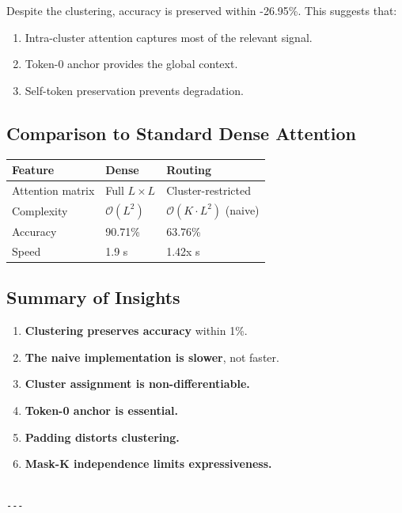 Despite the clustering, accuracy is preserved within -26.95\%. This 
suggests that:

\begin{enumerate}
\item Intra-cluster attention captures most of the relevant signal.
\item Token-0 anchor provides the global context.
\item Self-token preservation prevents degradation.

\end{enumerate}
\subsection{Comparison to Standard Dense Attention}

\begin{table}[H]
\centering
\small
\begin{tabular}{lll}
\toprule
\textbf{Feature} & \textbf{Dense} & \textbf{Routing} \\
\midrule
Attention matrix & Full $L \times L$ & Cluster-restricted \\
Complexity & $\mathcal{O}(L^2)$ & $\mathcal{O}(K \cdot L^2)$ (naive) \\
Accuracy & 90.71\% & 63.76\% \\
Speed & 1.9 s & 1.42x s \\
\bottomrule
\end{tabular}
\end{table}

\subsection{Summary of Insights}

\begin{enumerate}
\item \textbf{Clustering preserves accuracy} within 1\%.
\item \textbf{The naive implementation is slower}, not faster.
\item \textbf{Cluster assignment is non-differentiable.}
\item \textbf{Token-0 anchor is essential.}
\item \textbf{Padding distorts clustering.}
\item \textbf{Mask-K independence limits expressiveness.}
\end{enumerate}
\begin{lstlisting}

---
\end{lstlisting}

